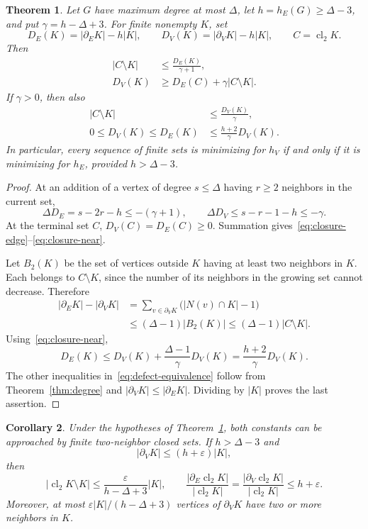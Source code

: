 \documentclass[11pt]{amsart}
\numberwithin{equation}{section}
\newtheorem{theorem}{Theorem}[section]
\newtheorem{corollary}[theorem]{Corollary}
\theoremstyle{definition}
\theoremstyle{remark}
\newcommand{\hE}{h_E}
\newcommand{\hV}{h_V}
\newcommand{\bE}{\partial_E}
\newcommand{\bV}{\partial_V}
\newcommand{\cl}{\operatorname{cl}_2}
\begin{document}
\begin{theorem}\label{thm:stability}
Let $G$ have maximum degree at most $\Delta$, let $h=\hE(G)\ge\Delta-3$, and put $\gamma=h-\Delta+3$. For finite nonempty $K$, set
\[
D_E(K)=|\bE K|-h|K|,\qquad
D_V(K)=|\bV K|-h|K|,\qquad C=\cl K.
\]
Then
\begin{align}
|C\setminus K|&\le\frac{D_E(K)}{\gamma+1},\label{eq:closure-edge}\\
D_V(K)&\ge D_E(C)+\gamma|C\setminus K|.\label{eq:closure-vertex}
\end{align}
If $\gamma>0$, then also
\begin{align}
|C\setminus K|&\le\frac{D_V(K)}\gamma,\label{eq:closure-near}\\
0\le D_V(K)\le D_E(K)&\le\frac{h+2}{\gamma}D_V(K).\label{eq:defect-equivalence}
\end{align}
In particular, every sequence of finite sets is minimizing for $\hV$ if and only if it is minimizing for $\hE$, provided $h>\Delta-3$.
\end{theorem}

\begin{proof}
At an addition of a vertex of degree $s\le\Delta$ having $r\ge2$ neighbors in the current set,
\[
\Delta D_E=s-2r-h\le-(\gamma+1),\qquad
\Delta D_V\le s-r-1-h\le-\gamma.
\]
At the terminal set $C$, $D_V(C)=D_E(C)\ge0$. Summation gives~\eqref{eq:closure-edge}--\eqref{eq:closure-near}.

Let $B_2(K)$ be the set of vertices outside $K$ having at least two neighbors in $K$. Each belongs to $C\setminus K$, since the number of its neighbors in the growing set cannot decrease. Therefore
\begin{align*}
|\bE K|-|\bV K|
&=\sum_{v\in\bV K}\bigl(|N(v)\cap K|-1\bigr)\\
&\le(\Delta-1)|B_2(K)|
\le(\Delta-1)|C\setminus K|.
\end{align*}
Using~\eqref{eq:closure-near},
\[
D_E(K)\le D_V(K)+\frac{\Delta-1}{\gamma}D_V(K)
=\frac{h+2}{\gamma}D_V(K).
\]
The other inequalities in~\eqref{eq:defect-equivalence} follow from Theorem~\ref{thm:degree} and $|\bV K|\le|\bE K|$. Dividing by $|K|$ proves the last assertion.
\end{proof}

\begin{corollary}\label{cor:minimizers}
Under the hypotheses of Theorem~\ref{thm:stability}, both constants can be approached by finite two-neighbor closed sets. If $h>\Delta-3$ and
\[
|\bV K|\le(h+\varepsilon)|K|,
\]
then
\[
|\cl K\setminus K|\le\frac{\varepsilon}{h-\Delta+3}|K|,
\qquad
\frac{|\bE\cl K|}{|\cl K|}
=\frac{|\bV\cl K|}{|\cl K|}\le h+\varepsilon.
\]
Moreover, at most $\varepsilon|K|/(h-\Delta+3)$ vertices of $\bV K$ have two or more neighbors in $K$.
\end{corollary}
\end{document}
